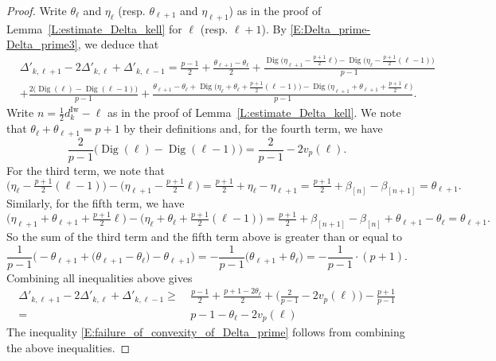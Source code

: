 \begin{proof}
    Write $\theta_\ell$ and $\eta_\ell$ (resp. $\theta_{\ell+1}$ and $\eta_{\ell+1}$) as in the proof of Lemma~\ref{L:estimate_Delta_kell} for $\ell$ (resp. $\ell+1$).
    By \eqref{E:Delta_prime-Delta_prime3}, we deduce that
    \begin{align*}
    &\Delta'_{k, \ell+1}-2\Delta'_{k,\ell}+\Delta'_{k,\ell-1} = \frac{p-1}2 +\frac{\theta_{\ell+1} - \theta_{\ell}}2 +\frac{{\operatorname{Dig}}\big(\eta_{\ell+1}-\frac{p+1}2\ell\big) - {\operatorname{Dig}}\big(\eta_{\ell}- \frac{p+1}2(\ell-1)\big)}{p-1}
    \\ &+ \frac{2\big( {\operatorname{Dig}}(\ell)-{\operatorname{Dig}}(\ell-1)\big)}{p-1} + \frac{\theta_{\ell+1} - \theta_{\ell}+{\operatorname{Dig}}\big(\eta_{\ell}+\theta_{\ell}+\frac{p+1}2(\ell-1)\big) - {\operatorname{Dig}}\big(\eta_{\ell+1}+\theta_{\ell+1}+ \frac{p+1}2\ell\big)}{p-1}.
    \end{align*}
    Write $n = \frac 12d_k^{\mathrm{Iw}}-\ell$ as in the proof of Lemma~\ref{L:estimate_Delta_kell}. We note that $\theta_\ell + \theta_{\ell+1} = p+1$ by their definitions and, for the fourth term, we have
    $$
    \frac2{p-1}\big({\operatorname{Dig}}(\ell) - {\operatorname{Dig}}(\ell-1)\big) =\frac2{p-1}-2v_p(\ell).
    $$
    For the third term, we note that
    $$
    \big(\eta_{\ell}- \tfrac{p+1}2(\ell-1)\big)- \big(\eta_{\ell+1}-\tfrac{p+1}2\ell\big)  = \tfrac{p+1}2 +\eta_{\ell} -\eta_{\ell+1} = \tfrac{p+1}2 + \beta_{[n]}-\beta_{[n+1]} = \theta_{\ell+1}.
    $$
    Similarly, for the fifth term, we have
    $$
    \big(\eta_{\ell+1}+\theta_{\ell+1}+ \tfrac{p+1}2\ell\big) - \big(\eta_{\ell}+\theta_{\ell}+\tfrac{p+1}2(\ell-1)\big) = \tfrac{p+1}2 + \beta_{[n+1]}- \beta_{[n]}+ \theta_{\ell+1}-\theta_{\ell} =\theta_{\ell+1}.
    $$
    So the sum of the third term and the fifth term above is greater than or equal to
    $$
    \frac 1{p-1}\Big( -\theta_{\ell+1} + \big(\theta_{\ell+1} - \theta_{\ell} \big) - \theta_{\ell+1}\Big) =- \frac1{p-1} \big(\theta_{\ell+1} + \theta_{\ell}\big) =- \frac 1{p-1} \cdot (p+1).
    $$
    Combining all inequalities above gives
    \begin{align*}
    \Delta'_{k, \ell+1}-2\Delta'_{k,\ell} + \Delta'_{k, \ell-1} \geq\ & \frac{p-1}2 + \frac{p+1-2\theta_\ell}2 +\Big(\frac2{p-1}-2v_p(\ell)\Big) - \frac{p+1}{p-1}
    \\
    =\ & p-1-\theta_\ell  -2 v_p(\ell)
    \end{align*}
    The inequality \eqref{E:failure_of_convexity_of_Delta_prime} follows from combining the above inequalities.
\end{proof}

